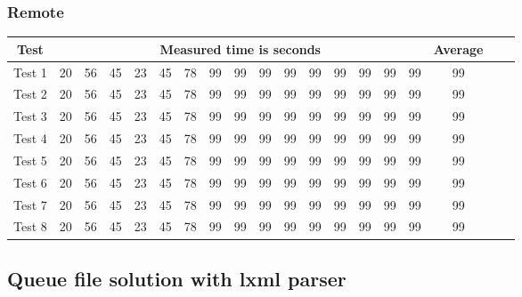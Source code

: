 \subsubsection{Remote}
\begin{center}
    \begin{tabular}{| c | c | c | c | c | c | c | c | c | c | c | c | c | c | c | c | c | c | c |}
    \hline
    Test & \multicolumn{15}{|c|}{Measured time is seconds} & Average \\ \hline
    Test 1 & 20 & 56 & 45 & 23 & 45 & 78 & 99 & 99 & 99 & 99 & 99 & 99 & 99 & 99 & 99 & 99 \\ \hline
    Test 2 & 20 & 56 & 45 & 23 & 45 & 78 & 99 & 99 & 99 & 99 & 99 & 99 & 99 & 99 & 99 & 99 \\ \hline
    Test 3 & 20 & 56 & 45 & 23 & 45 & 78 & 99 & 99 & 99 & 99 & 99 & 99 & 99 & 99 & 99 & 99 \\ \hline
    Test 4 & 20 & 56 & 45 & 23 & 45 & 78 & 99 & 99 & 99 & 99 & 99 & 99 & 99 & 99 & 99 & 99 \\ \hline
    Test 5 & 20 & 56 & 45 & 23 & 45 & 78 & 99 & 99 & 99 & 99 & 99 & 99 & 99 & 99 & 99 & 99 \\ \hline
    Test 6 & 20 & 56 & 45 & 23 & 45 & 78 & 99 & 99 & 99 & 99 & 99 & 99 & 99 & 99 & 99 & 99 \\ \hline
    Test 7 & 20 & 56 & 45 & 23 & 45 & 78 & 99 & 99 & 99 & 99 & 99 & 99 & 99 & 99 & 99 & 99 \\ \hline
    Test 8 & 20 & 56 & 45 & 23 & 45 & 78 & 99 & 99 & 99 & 99 & 99 & 99 & 99 & 99 & 99 & 99 \\ \hline
    \end{tabular}
\end{center}
\subsection{Queue file solution with lxml parser}
